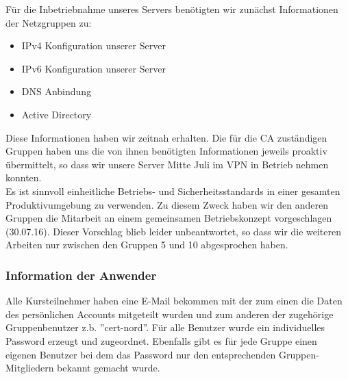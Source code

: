 Für die Inbetriebnahme unseres Servers benötigten wir zunächst Informationen der Netzgruppen zu:
\begin{itemize}
\item IPv4 Konfiguration unserer Server
\item IPv6 Konfiguration unserer Server
\item DNS Anbindung
\item Active Directory
\end{itemize}
Diese Informationen haben wir zeitnah erhalten. Die für die CA zuständigen Gruppen haben uns die von ihnen benötigten Informationen jeweils proaktiv übermittelt, so dass wir unsere Server Mitte Juli im VPN in Betrieb nehmen konnten.\\

Es ist sinnvoll einheitliche Betriebs- und Sicherheitsstandards in einer gesamten Produktivumgebung zu verwenden. Zu diesem Zweck haben wir den anderen Gruppen die Mitarbeit an einem gemeinsamen Betriebskonzept vorgeschlagen (30.07.16). Dieser Vorschlag blieb leider unbeantwortet, so dass wir die weiteren Arbeiten nur zwischen den Gruppen 5 und 10 abgesprochen haben.

\subsubsection{Information der Anwender}
Alle Kursteilnehmer haben eine E-Mail bekommen mit der zum einen die Daten des
persönlichen Accounts mitgeteilt wurden und zum anderen der zugehörige
Gruppenbenutzer z.b. ''cert-nord''. Für alle Benutzer wurde ein individuelles
Password erzeugt und zugeordnet. Ebenfalls gibt es für jede Gruppe einen
eigenen Benutzer bei dem das Password nur den entsprechenden
Gruppen-Mitgliedern bekannt gemacht wurde.\\

